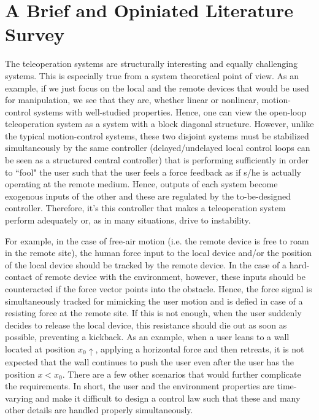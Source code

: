 \chapter{A Brief and Opiniated Literature Survey}\label{chap:litsurvey}

The teleoperation systems are structurally interesting and equally challenging 
systems. This is especially true from a system theoretical point of view. As an example, 
if we just focus on the local and the remote devices that would be used for manipulation, 
we see that they are, whether linear or nonlinear, motion-control systems with well-studied 
properties. Hence, one can view the open-loop teleoperation system as a system with a block 
diagonal structure. However, unlike the typical motion-control systems, these two disjoint systems must be stabilized 
simultaneously by the same controller (delayed/undelayed local control loops can be seen as a structured central
controller) that is performing sufficiently in order to ``fool" the user such that the user feels 
a force feedback as if s/he is actually operating at the remote medium. Hence, outputs of each system become
exogenous inputs of the other and these are regulated by the to-be-designed controller. Therefore, it's this controller 
that makes a teleoperation system perform adequately or, as in many situations, drive to instability.


For example, in the case of free-air motion (i.e. the remote device is free to roam in the remote site), the human force input 
to the local device and/or the position of the local device should be tracked by the remote device. In the case of a 
hard-contact of remote device with the environment, however, these inputs should be counteracted  if the force vector points into 
the obstacle. Hence, the force signal is simultaneously tracked for mimicking the user motion and  
is defied in case of a resisting force at the remote site. If this is not enough, when the user suddenly decides to release the 
local device, this resistance should die out as soon as possible, preventing a kickback. As an example, when a user leans to a wall located at 
position $x_0\!\!\uparrow$, applying a horizontal force and then retreats, it is not expected that the wall continues to 
push the user even after the user has the position $x<x_0$. There are a few other scenarios that would further complicate 
the requirements. In short, the user and the environment properties are time-varying and make it difficult to design a control 
law such that these and many other details are handled properly simultaneously. 


